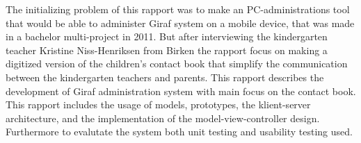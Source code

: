 The initializing problem of this rapport was to make an PC-administrations tool that would be able to administer Giraf system on a mobile device, that was made in a bachelor multi-project in 2011. But after interviewing the kindergarten teacher Kristine Niss-Henriksen from Birken the rapport focus on making a  digitized version of the children's contact book that simplify the communication between the kindergarten teachers and parents. 
This rapport describes the development of Giraf administration system with main focus on the contact book. This rapport includes the usage of models, prototypes, the klient-server architecture, and the implementation of the model-view-controller design. Furthermore to evalutate the system both unit testing and usability testing used. 